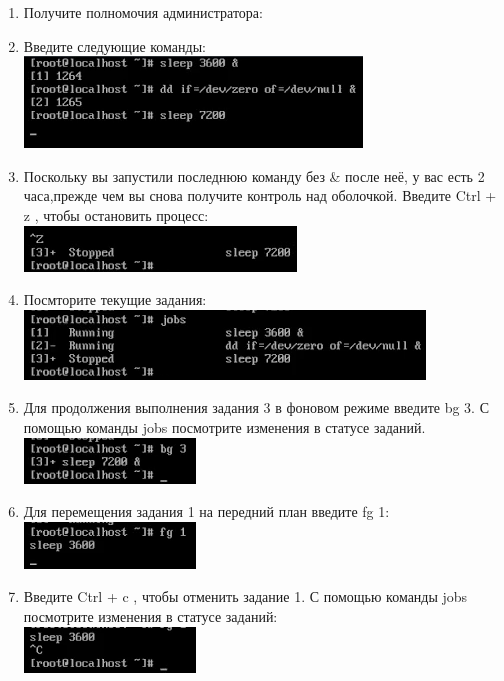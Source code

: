 \documentclass[12pt]{article}
\begin{document}
\begin{enumerate}
	\item Получите полномочия администратора:
	\item Введите следующие команды: \\
	      \includegraphics{1.png}
	\item Поскольку вы запустили последнюю команду без \& после неё, у вас есть 2 часа,прежде чем вы снова получите контроль над оболочкой. Введите Ctrl + z , чтобы остановить процесс: \\
	      \includegraphics{2.png}
	\item Посмторите текущие задания: \\
	      \includegraphics{3.png}
	\item Для продолжения выполнения задания 3 в фоновом режиме введите bg 3. С помощью команды jobs посмотрите изменения в статусе заданий. \\
	      \includegraphics{4.png}
	\item Для перемещения задания 1 на передний план введите fg 1: \\
	      \includegraphics{5.png}
	\item Введите Ctrl + c , чтобы отменить задание 1. С помощью команды jobs посмотрите изменения в статусе заданий: \\
	      \includegraphics{6.png}

\end{enumerate}
\end{document}
